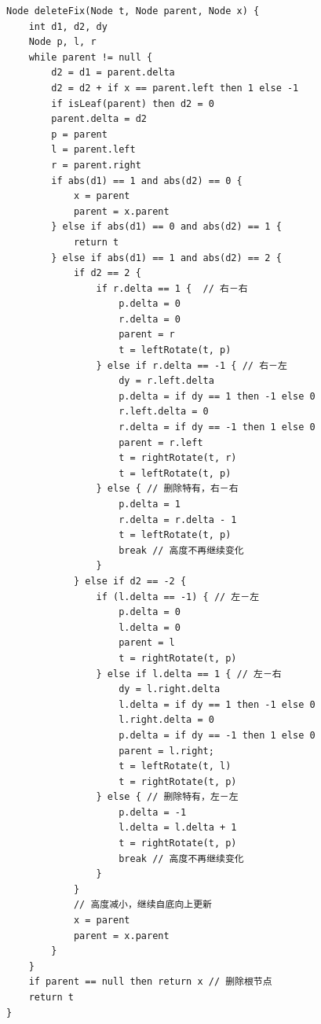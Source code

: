 \documentclass[b5paper]{ctexart}
\begin{document}
\begin{lstlisting}[language = Bourbaki]
Node deleteFix(Node t, Node parent, Node x) {
    int d1, d2, dy
    Node p, l, r
    while parent != null {
        d2 = d1 = parent.delta
        d2 = d2 + if x == parent.left then 1 else -1
        if isLeaf(parent) then d2 = 0
        parent.delta = d2
        p = parent
        l = parent.left
        r = parent.right
        if abs(d1) == 1 and abs(d2) == 0 {
            x = parent
            parent = x.parent
        } else if abs(d1) == 0 and abs(d2) == 1 {
            return t
        } else if abs(d1) == 1 and abs(d2) == 2 {
            if d2 == 2 {
                if r.delta == 1 {  // 右－右
                    p.delta = 0
                    r.delta = 0
                    parent = r
                    t = leftRotate(t, p)
                } else if r.delta == -1 { // 右－左
                    dy = r.left.delta
                    p.delta = if dy == 1 then -1 else 0
                    r.left.delta = 0
                    r.delta = if dy == -1 then 1 else 0
                    parent = r.left
                    t = rightRotate(t, r)
                    t = leftRotate(t, p)
                } else { // 删除特有，右－右
                    p.delta = 1
                    r.delta = r.delta - 1
                    t = leftRotate(t, p)
                    break // 高度不再继续变化
                }
            } else if d2 == -2 {
                if (l.delta == -1) { // 左－左
                    p.delta = 0
                    l.delta = 0
                    parent = l
                    t = rightRotate(t, p)
                } else if l.delta == 1 { // 左－右
                    dy = l.right.delta
                    l.delta = if dy == 1 then -1 else 0
                    l.right.delta = 0
                    p.delta = if dy == -1 then 1 else 0
                    parent = l.right;
                    t = leftRotate(t, l)
                    t = rightRotate(t, p)
                } else { // 删除特有，左－左
                    p.delta = -1
                    l.delta = l.delta + 1
                    t = rightRotate(t, p)
                    break // 高度不再继续变化
                }
            }
            // 高度减小，继续自底向上更新
            x = parent
            parent = x.parent
        }
    }
    if parent == null then return x // 删除根节点
    return t
}
\end{lstlisting}

\ifx\wholebook\relax \else




\expandafter\enddocument
\fi
\end{document}
